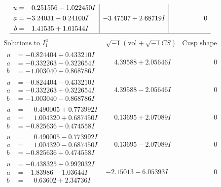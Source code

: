 \documentclass[1p]{elsarticle_modified}
\theoremstyle{definition}
\newcommand{\I}{\sqrt{-1}}
\begin{document}
$$\begin{array}{c|c|c}
\begin{aligned}
u &= \phantom{-}0.251556 - 1.022450 I \\
a &= -3.24031 - 0.24100 I \\
b &= \phantom{-}1.41535 + 1.01544 I\end{aligned}
 & -3.47507 + 2.68719 I & \phantom{-0.000000 } 0\\
 \hline 
 \end{array}$$\newpage$$\begin{array}{c|c|c}  
\text{Solutions to }I^u_{1}& \I (\text{vol} + \sqrt{-1}CS) & \text{Cusp shape}\\
 \hline 
\begin{aligned}
u &= -0.824404 + 0.433210 I \\
a &= -0.332263 - 0.322654 I \\
b &= -1.003040 + 0.868786 I\end{aligned}
 & \phantom{-}4.39588 + 2.05646 I & \phantom{-0.000000 } 0 \\ \hline\begin{aligned}
u &= -0.824404 - 0.433210 I \\
a &= -0.332263 + 0.322654 I \\
b &= -1.003040 - 0.868786 I\end{aligned}
 & \phantom{-}4.39588 - 2.05646 I & \phantom{-0.000000 } 0 \\ \hline\begin{aligned}
u &= \phantom{-}0.490005 + 0.773992 I \\
a &= \phantom{-}1.004320 + 0.687450 I \\
b &= -0.825636 - 0.474558 I\end{aligned}
 & \phantom{-}0.13695 + 2.07089 I & \phantom{-0.000000 } 0 \\ \hline\begin{aligned}
u &= \phantom{-}0.490005 - 0.773992 I \\
a &= \phantom{-}1.004320 - 0.687450 I \\
b &= -0.825636 + 0.474558 I\end{aligned}
 & \phantom{-}0.13695 - 2.07089 I & \phantom{-0.000000 } 0 \\ \hline\begin{aligned}
u &= -0.438325 + 0.992032 I \\
a &= -1.83986 - 1.03644 I \\
b &= \phantom{-}0.63602 + 2.34736 I\end{aligned}
 & -2.15013 - 6.05393 I & \phantom{-0.000000 } 0 \\ \hline\begin{aligned}

\end{aligned}
\end{array}$$
\end{document}
